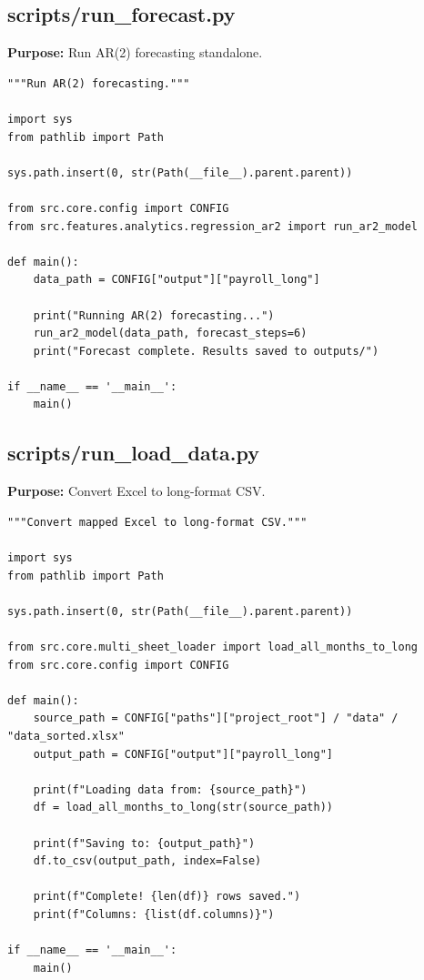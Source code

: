 \subsection{scripts/run\_forecast.py}

\textbf{Purpose:} Run AR(2) forecasting standalone.

\begin{lstlisting}[style=pythonstyle]
"""Run AR(2) forecasting."""

import sys
from pathlib import Path

sys.path.insert(0, str(Path(__file__).parent.parent))

from src.core.config import CONFIG
from src.features.analytics.regression_ar2 import run_ar2_model

def main():
    data_path = CONFIG["output"]["payroll_long"]
    
    print("Running AR(2) forecasting...")
    run_ar2_model(data_path, forecast_steps=6)
    print("Forecast complete. Results saved to outputs/")

if __name__ == '__main__':
    main()
\end{lstlisting}

\subsection{scripts/run\_load\_data.py}

\textbf{Purpose:} Convert Excel to long-format CSV.

\begin{lstlisting}[style=pythonstyle]
"""Convert mapped Excel to long-format CSV."""

import sys
from pathlib import Path

sys.path.insert(0, str(Path(__file__).parent.parent))

from src.core.multi_sheet_loader import load_all_months_to_long
from src.core.config import CONFIG

def main():
    source_path = CONFIG["paths"]["project_root"] / "data" / "data_sorted.xlsx"
    output_path = CONFIG["output"]["payroll_long"]
    
    print(f"Loading data from: {source_path}")
    df = load_all_months_to_long(str(source_path))
    
    print(f"Saving to: {output_path}")
    df.to_csv(output_path, index=False)
    
    print(f"Complete! {len(df)} rows saved.")
    print(f"Columns: {list(df.columns)}")

if __name__ == '__main__':
    main()
\end{lstlisting}

